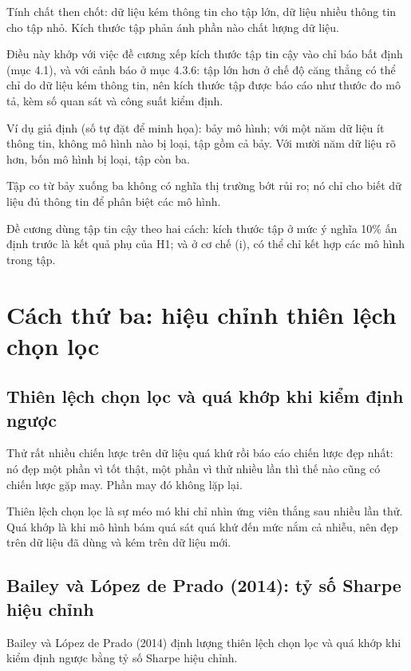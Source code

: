 Tính chất then chốt: dữ liệu kém thông tin cho tập lớn, dữ liệu nhiều thông tin cho tập nhỏ. Kích thước tập phản ánh phần nào chất lượng dữ liệu.

Điều này khớp với việc đề cương xếp kích thước tập tin cậy vào chỉ báo bất định (mục 4.1), và với cảnh báo ở mục 4.3.6: tập lớn hơn ở chế độ căng thẳng có thể chỉ do dữ liệu kém thông tin, nên kích thước tập được báo cáo như thước đo mô tả, kèm số quan sát và công suất kiểm định.

\begin{tcolorbox}[breakable]
Ví dụ giả định (số tự đặt để minh họa): bảy mô hình; với một năm dữ liệu ít thông tin, không mô hình nào bị loại, tập gồm cả bảy. Với mười năm dữ liệu rõ hơn, bốn mô hình bị loại, tập còn ba.

Tập co từ bảy xuống ba không có nghĩa thị trường bớt rủi ro; nó chỉ cho biết dữ liệu đủ thông tin để phân biệt các mô hình.
\end{tcolorbox}

Đề cương dùng tập tin cậy theo hai cách: kích thước tập ở mức ý nghĩa 10\% ấn định trước là kết quả phụ của H1; và ở cơ chế (i), có thể chỉ kết hợp các mô hình trong tập.

\section{Cách thứ ba: hiệu chỉnh thiên lệch chọn lọc}

\subsection{Thiên lệch chọn lọc và quá khớp khi kiểm định ngược}

Thử rất nhiều chiến lược trên dữ liệu quá khứ rồi báo cáo chiến lược đẹp nhất: nó đẹp một phần vì tốt thật, một phần vì thử nhiều lần thì thế nào cũng có chiến lược gặp may. Phần may đó không lặp lại.

Thiên lệch chọn lọc là sự méo mó khi chỉ nhìn ứng viên thắng sau nhiều lần thử. Quá khớp là khi mô hình bám quá sát quá khứ đến mức nắm cả nhiễu, nên đẹp trên dữ liệu đã dùng và kém trên dữ liệu mới.

\subsection{Bailey và López de Prado (2014): tỷ số Sharpe hiệu chỉnh}

Bailey và López de Prado (2014) định lượng thiên lệch chọn lọc và quá khớp khi kiểm định ngược bằng tỷ số Sharpe hiệu chỉnh.

